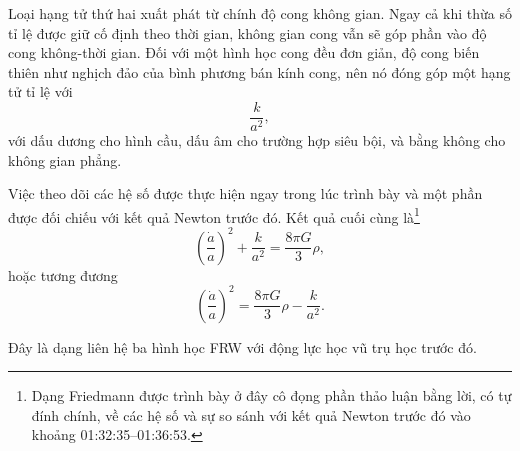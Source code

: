 Loại hạng tử thứ hai xuất phát từ chính độ cong không gian. Ngay cả khi thừa số tỉ lệ được giữ cố định theo thời gian, không gian cong vẫn sẽ góp phần vào độ cong không-thời gian. Đối với một hình học cong đều đơn giản, độ cong biến thiên như nghịch đảo của bình phương bán kính cong, nên nó đóng góp một hạng tử tỉ lệ với
\begin{equation}
\frac{k}{a^2},
\end{equation}
với dấu dương cho hình cầu, dấu âm cho trường hợp siêu bội, và bằng không cho không gian phẳng.

\begin{classroomqa}
\end{classroomqa}

Việc theo dõi các hệ số được thực hiện ngay trong lúc trình bày và một phần được đối chiếu với kết quả Newton trước đó. Kết quả cuối cùng là\footnote{Dạng Friedmann được trình bày ở đây cô đọng phần thảo luận bằng lời, có tự đính chính, về các hệ số và sự so sánh với kết quả Newton trước đó vào khoảng 01:32:35--01:36:53.}
\begin{equation}
\left(\frac{\dot a}{a}\right)^2+\frac{k}{a^2}=\frac{8\pi G}{3}\rho,
\end{equation}
hoặc tương đương
\begin{equation}
\left(\frac{\dot a}{a}\right)^2=\frac{8\pi G}{3}\rho-\frac{k}{a^2}.
\end{equation}

Đây là dạng liên hệ ba hình học FRW với động lực học vũ trụ học trước đó.

\begin{classroomqa}
\end{classroomqa}

\begin{classroomqa}
\end{classroomqa}

